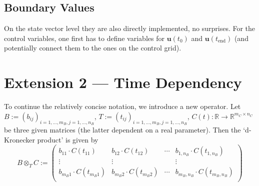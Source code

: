 \documentclass{article}
\newcommand{\defeq}{\mathrel{:=}}%
\newcommand{\kron}{\otimes}%
\newcommand{\dkron}[2][]{\mathbin{\kron_{#2}^{#1}}}%
\newcommand{\setR}{\mathbb{R}}%
\newcommand{\vectorfont}[1]{\boldsymbol{#1}}%
\newcommand{\uvec}{\vectorfont{u}}
\begin{document}
%
\subsection*{Boundary Values}
%
On the state vector level they are also directly implemented, no surprises.
For the control variables, one first has to define variables for $\uvec(t_0)$ and $\uvec(t_{\mathrm{end}})$ (and potentially connect them to the ones on the control grid).



%
\newpage

\section*{Extension 2 --- Time Dependency}

To continue the relatively concise notation, we introduce a new operator.
Let $B \defeq (b_{ij})_{i=1,\ldots,m_B, j=1,\ldots,n_B}$, $T \defeq (t_{ij})_{i=1,\ldots,m_B, j=1,\ldots,n_B}$, $C(t) %
\colon \setR \to \setR^{m_C \times n_C}$ be three given matrices (the latter dependent on a real parameter).
Then the `d-Kronecker product' is given by
\[
B \dkron{T} C \defeq \begin{pmatrix}
 b_{11} \cdot C(t_{11}) & b_{12}\cdot C(t_{12}) & \cdots & b_{1,n_B} \cdot C(t_{1,n_B}) \\
 \vdots                 & \vdots                &        & \vdots                       \\
 b_{m_B1} \cdot C(t_{m_B1}) & b_{m_B2}\cdot C(t_{m_B2}) & \cdots & b_{m_B,n_B} \cdot C(t_{m_B,n_B}) \\
\end{pmatrix}
\]
\end{document}
